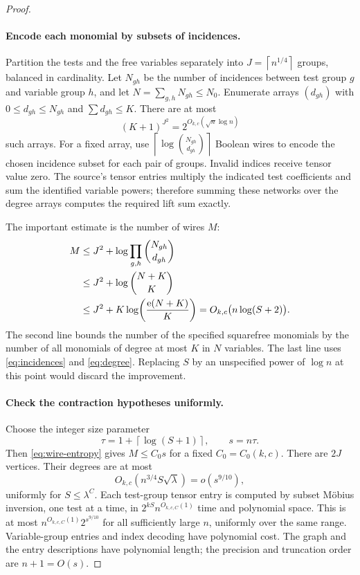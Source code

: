 \documentclass[11pt]{article}
\numberwithin{equation}{section}
\theoremstyle{definition}\newtheorem{definition}[theorem]{Definition}
\theoremstyle{remark}\newtheorem{remark}[theorem]{Remark}
\newcommand{\ceil}[1]{\left\lceil#1\right\rceil}
\begin{document}
\begin{proof}
\paragraph{Encode each monomial by subsets of incidences.}
Partition the tests and the free variables separately into
$J=\ceil{n^{1/4}}$ groups, balanced in cardinality. Let $N_{gh}$
be the number of incidences between test group $g$ and variable group
$h$, and let $N=\sum_{g,h}N_{gh}\le N_0$. Enumerate arrays
$(d_{gh})$ with $0\le d_{gh}\le N_{gh}$ and
$\sum d_{gh}\le K$. There are at most
\[
 (K+1)^{J^2}=2^{O_{k,c}(\sqrt n\log n)}
\]
such arrays. For a fixed array, use
$\ceil{\log\binom{N_{gh}}{d_{gh}}}$ Boolean wires to encode the
chosen incidence subset for each pair of groups. Invalid indices
receive tensor value zero. The source's tensor entries multiply the
indicated test coefficients and sum the identified variable powers;
therefore summing these networks over the degree arrays computes the
required lift sum exactly.

The important estimate is the number of wires $M$:
\begin{align}
 M&\le J^2+\log\prod_{g,h}\binom{N_{gh}}{d_{gh}}\notag\\
  &\le J^2+\log\binom{N+K}{K}\notag\\
  &\le J^2+K\log\!\left(\frac{\mathrm e(N+K)}K\right)
    =O_{k,c}\bigl(n\log(S+2)\bigr).
 \label{eq:wire-entropy}
\end{align}
The second line bounds the number of the specified squarefree
monomials by the number of all monomials of degree at most $K$ in
$N$ variables. The last line uses \eqref{eq:incidences} and
\eqref{eq:degree}. Replacing $S$ by an unspecified power of $\log n$
at this point would discard the improvement.

\paragraph{Check the contraction hypotheses uniformly.}
Choose the integer size parameter
\[
 \tau=1+\ceil{\log(S+1)},\qquad s=n\tau.
\]
Then \eqref{eq:wire-entropy} gives $M\le C_0s$ for a fixed
$C_0=C_0(k,c)$. There are $2J$ vertices. Their degrees are at most
\[
 O_{k,c}(n^{3/4}S\sqrt\lambda)=o(s^{9/10}),
\]
uniformly for $S\le\lambda^C$. Each test-group tensor entry is
computed by subset M\"obius inversion, one test at a time, in
$2^{kS}n^{O_{k,c,C}(1)}$ time and polynomial space. This is at most
$n^{O_{k,c,C}(1)}2^{s^{9/10}}$ for all sufficiently large $n$,
uniformly over the same range. Variable-group entries and index
decoding have polynomial cost. The graph and the entry descriptions
have polynomial length; the precision and truncation order are
$n+1=O(s)$.


\end{proof}
\end{document}
